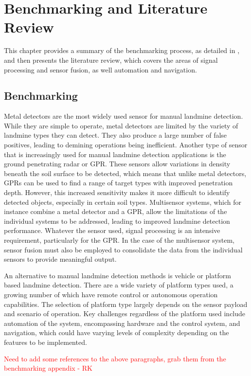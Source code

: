 \documentclass[main.tex]{subfiles}
\begin{document}
\chapter{Benchmarking and Literature Review}
This chapter provides a summary of the benchmarking process, as detailed in , and then presents the literature review, which covers the areas of signal processing and sensor fusion, as well automation and navigation.

\section{Benchmarking}
Metal detectors are the most widely used sensor for manual landmine detection. While they are simple to operate, metal detectors are limited by the variety of landmine types they can detect. They also produce a large number of false positives, leading to demining operations being inefficient. Another type of sensor that is increasingly used for manual landmine detection applications is the ground penetrating radar or GPR. These sensors allow variations in density beneath the soil surface to be detected, which means that unlike metal detectors, GPRs can be used to find a range of target types with improved penetration depth. However, this increased sensitivity makes it more difficult to identify detected objects, especially in certain soil types. Multisensor systems, which for instance combine a metal detector and a GPR, allow the limitations of the individual systems to be addressed, leading to improved landmine detection performance. Whatever the sensor used, signal processing is an intensive requirement, particularly for the GPR. In the case of the multisensor system, sensor fusion must also be employed to consolidate the data from the individual sensors to provide meaningful output.  

An alternative to manual landmine detection methods is vehicle or platform based landmine detection. There are a wide variety of platform types used, a growing number of which have remote control or autonomous operation capabilities. The selection of platform type largely depends on the sensor payload and scenario of operation. Key challenges regardless of the platform used include automation of the system, encompassing hardware and the control system, and navigation, which could have varying levels of complexity depending on the features to be implemented. 

\textcolor{red}{Need to add some references to the above paragraphs, grab them from the benchmarking appendix - RK}
\end{document}

